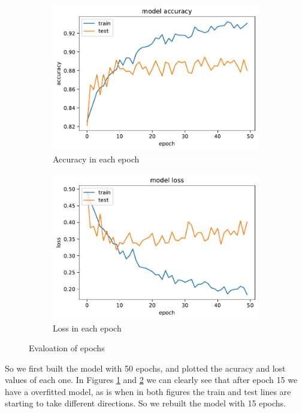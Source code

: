 \documentclass{article}
\begin{document}
\begin{figure}[H]
    \centering
    \begin{subfigure}{.49\textwidth}
      \centering
      \includegraphics[width=1\textwidth]{./img/epochs_accuracy.pdf}
      \caption{Accuracy in each epoch}
      \label{fig:EpochAccuracy}
    \end{subfigure}
    \begin{subfigure}{.49\textwidth}
        \centering
        \includegraphics[width=1\textwidth]{./img/epochs_loss.pdf}
        \caption{Loss in each epoch}
        \label{fig:EpochLoss}
    \end{subfigure}
    \caption{Evaloation of epochs}
    \label{fig:EvaloationOfEpochs}
\end{figure}

So we first built the model with 50 epochs, and plotted the acuracy and lost values of each one. In Figures \ref{fig:EpochAccuracy} and \ref{fig:EpochLoss} we can clearly see that after epoch 15 we have a overfitted model, as is when in both figures the train and test lines are starting to take different directions. So we rebuilt the model with 15 epochs.
\end{document}
